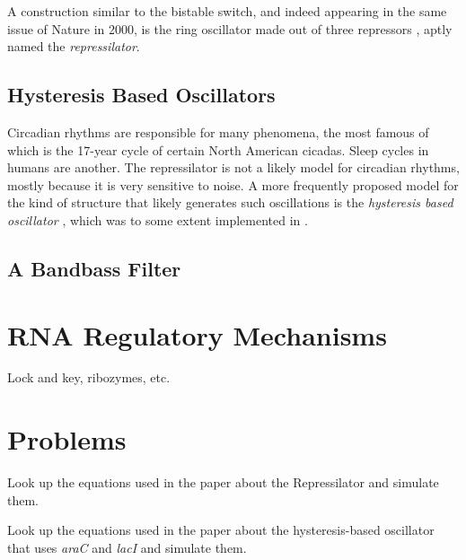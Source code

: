 A construction similar to the bistable switch, and indeed appearing in
the same issue of Nature in 2000, is the ring oscillator made out of
three repressors \cite{elowitz-repressilator}, aptly named the
{\em repressilator}.

\subsection{Hysteresis Based Oscillators}

Circadian rhythms are responsible for many phenomena, the most famous
of which is the 17-year cycle of certain North American cicadas. Sleep
cycles in humans are another. The repressilator is not a likely model
for circadian rhythms, mostly because it is very sensitive to noise. A
more frequently proposed model for the kind of structure that likely
generates such oscillations is the {\em hysteresis based oscillator}
\cite{barkai-leibler-circadian}, which was to some extent implemented in 
\cite{ninfa-oscillator}.

\cite{hasty-oscillator}

\subsection{A Bandbass Filter}

\cite{weiss-communication}

\section{RNA Regulatory Mechanisms}

Lock and key, ribozymes, etc.
\cite{rna-synthetic-biology}

\setcounter{exercount}{0}

\section{Problems}

\begin{exercise}
  Look up the equations used in the paper about the Repressilator
  \cite{elowitz-repressilator} and simulate them. 
\end{exercise}

\begin{exercise}
  Look up the equations used in the paper about the hysteresis-based
  oscillator that uses {\em araC} and {\em lacI}
  \cite{hasty-oscillator} and simulate them.
\end{exercise}